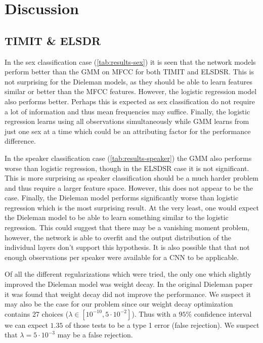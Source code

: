 \section{Discussion}
\subsection{TIMIT \& ELSDR}
In the sex classification case (\cref{tab:results-sex}) it is seen that the network models perform better than the GMM on MFCC for both TIMIT and ELSDSR. This is not surprising for the Dieleman models, as they should be able to learn features similar or better than the MFCC features. However, the logistic regression model also performs better. Perhaps this is expected as sex classification do not require a lot of information and thus mean frequencies may suffice. Finally, the logistic regression learns using all observations simultaneously while GMM learns from just one sex at a time which could be an attributing factor for the performance difference.

In the speaker classification case (\cref{tab:results-speaker}) the GMM also performs worse than logistic regression, though in the ELSDSR case it is not significant. This is more surprising as speaker classification should be a much harder problem and thus require a larger feature space. However, this does not appear to be the case. Finally, the Dieleman model performs significantly worse than logistic regression which is the most surprising result. At the very least, one would expect the Dieleman model to be able to learn something similar to the logistic regression. This could suggest that there may be a vanishing moment problem, however, the network is able to overfit and the output distribution of the individual layers don't support this hypothesis. It is also possible that that not enough observations per speaker were available for a CNN to be applicable.

Of all the different regularizations which were tried, the only one which slightly improved the Dieleman model was weight decay. In the original Dieleman paper \cite{dieleman} it was found that weight decay did not improve the performance. We suspect it may also be the case for our problem since our weight decay optimization contains 27 choices ($\lambda \in [10^{-10}, 5 \cdot 10^{-2}]$). Thus with a $95\%$ confidence interval we can expect $1.35$ of those tests to be a type 1 error (false rejection). We suspect that $\lambda = 5 \cdot 10^{-3}$ may be a false rejection.

